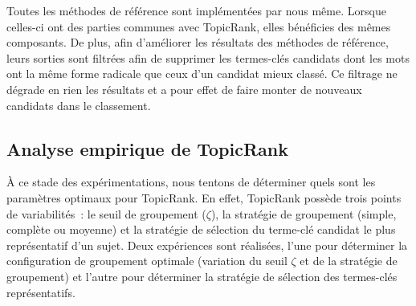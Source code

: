       Toutes les méthodes de référence sont implémentées par nous même. Lorsque
      celles-ci ont des parties communes avec TopicRank, elles bénéficies des
      mêmes composants. De plus, afin d'améliorer les résultats des méthodes de
      référence, leurs sorties sont filtrées afin de supprimer les termes-clés
      candidats dont les mots ont la même forme radicale que ceux d'un candidat
      mieux classé. Ce filtrage ne dégrade en rien les résultats et a pour effet
      de faire monter de nouveaux candidats dans le classement.

  \subsection{Analyse empirique de TopicRank}
  \label{subsection:configuration_empirique_de_topicrank}
    À ce stade des expérimentations, nous tentons de déterminer quels sont les
    paramètres optimaux pour TopicRank. En effet, TopicRank possède trois points
    de variabilités~: le seuil de groupement ($\zeta$), la stratégie de
    groupement (simple, complète ou moyenne) et la stratégie de sélection du
    terme-clé candidat le plus représentatif d'un sujet. Deux expériences sont
    réalisées, l'une pour déterminer la configuration de groupement optimale
    (variation du seuil $\zeta$ et de la stratégie de groupement) et l'autre
    pour déterminer la stratégie de sélection des termes-clés représentatifs.

